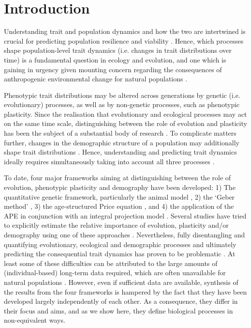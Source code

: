 \section{Introduction}

Understanding trait and population dynamics and how the two are intertwined is crucial for predicting population resilience and viability \parencite[e.g.][]{Merila2014}. Hence, which processes shape population-level trait dynamics (i.e. changes in trait distributions over time) is a fundamental question in ecology and evolution, and one which is gaining in urgency given mounting concern regarding the consequences of anthropogenic environmental change for natural populations \parencite[e.g.][]{parmesan2006}.

Phenotypic trait distributions may be altered across generations by genetic (i.e. evolutionary) processes, as well as by non-genetic processes, such as phenotypic plasticity. Since the realisation that evolutionary and ecological processes may act on the same time scale, distinguishing between the role of evolution and plasticity has been the subject of a substantial body of research \parencite{Hairston2005,Gienapp2008,Post2009}. To complicate matters further, changes in the demographic structure of a population may additionally shape trait distributions \parencite{Coulson2008}. Hence, understanding and predicting trait dynamics ideally requires simultaneously taking into account all three processes \parencite{Pelletier2007,Schoener2011}. 

To date, four major frameworks aiming at distinguishing between the role of evolution, phenotypic plasticity and demography have been developed: 1) The quantitative genetic framework, particularly the animal model \parencite[AM; e.g.][]{Henderson1950}, 2) the `Geber method' \parencite[GM;][]{Hairston2005}, 3) the age-structured Price equation \parencite[APE;][]{Coulson2008}, and 4) the application of the APE in conjunction with an integral projection model \parencite[IPM;][]{easterling2000,Ellner2006,Coulson2010}. Several studies have tried to explicitly estimate the relative importance of evolution, plasticity and/or demography using one of these approaches \parencite[e.g.][]{Reale2003, Ezard2009, Ozgul2009, Rebke2010, Becks2012, Morrissey2012sts}. Nevertheless, fully disentangling and quantifying evolutionary, ecological and demographic processes and ultimately predicting the consequential trait dynamics has proven to be problematic \parencite{Gienapp2008,Schoener2011,Merila2014}. At least some of these difficulties can be attributed to the large amounts of (individual-based) long-term data required, which are often unavailable for natural populations \parencite{Clutton-brock2010}. However, even if sufficient data are available, synthesis of the results from the four frameworks is hampered by the fact that they have been developed largely independently of each other. As a consequence, they differ in their focus and aims, and as we show here, they define biological processes in non-equivalent ways.  

